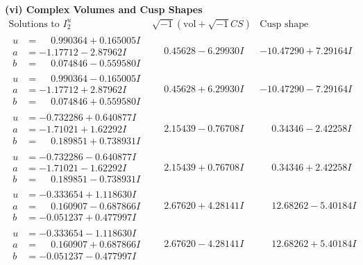 \documentclass[1p]{elsarticle_modified}
\theoremstyle{definition}
\newcommand{\I}{\sqrt{-1}}
\begin{document}
\newpage\flushleft \textbf{(vi) Complex Volumes and Cusp Shapes}
$$\begin{array}{c|c|c}  
\text{Solutions to }I^u_{2}& \I (\text{vol} + \sqrt{-1}CS) & \text{Cusp shape}\\
 \hline 
\begin{aligned}
u &= \phantom{-}0.990364 + 0.165005 I \\
a &= -1.17712 - 2.87962 I \\
b &= \phantom{-}0.074846 - 0.559580 I\end{aligned}
 & \phantom{-}0.45628 - 6.29930 I & -10.47290 + 7.29164 I \\ \hline\begin{aligned}
u &= \phantom{-}0.990364 - 0.165005 I \\
a &= -1.17712 + 2.87962 I \\
b &= \phantom{-}0.074846 + 0.559580 I\end{aligned}
 & \phantom{-}0.45628 + 6.29930 I & -10.47290 - 7.29164 I \\ \hline\begin{aligned}
u &= -0.732286 + 0.640877 I \\
a &= -1.71021 + 1.62292 I \\
b &= \phantom{-}0.189851 + 0.738931 I\end{aligned}
 & \phantom{-}2.15439 - 0.76708 I & \phantom{-}0.34346 - 2.42258 I \\ \hline\begin{aligned}
u &= -0.732286 - 0.640877 I \\
a &= -1.71021 - 1.62292 I \\
b &= \phantom{-}0.189851 - 0.738931 I\end{aligned}
 & \phantom{-}2.15439 + 0.76708 I & \phantom{-}0.34346 + 2.42258 I \\ \hline\begin{aligned}
u &= -0.333654 + 1.118630 I \\
a &= \phantom{-}0.160907 - 0.687866 I \\
b &= -0.051237 + 0.477997 I\end{aligned}
 & \phantom{-}2.67620 + 4.28141 I & \phantom{-}12.68262 - 5.40184 I \\ \hline\begin{aligned}
u &= -0.333654 - 1.118630 I \\
a &= \phantom{-}0.160907 + 0.687866 I \\
b &= -0.051237 - 0.477997 I\end{aligned}
 & \phantom{-}2.67620 - 4.28141 I & \phantom{-}12.68262 + 5.40184 I \\ \hline\begin{aligned}

\end{aligned}
\end{array}$$
\end{document}
